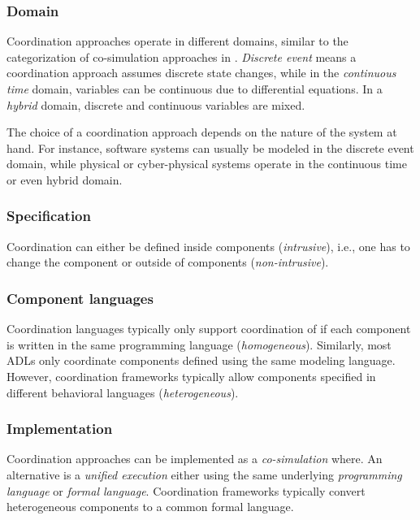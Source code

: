 \documentclass[runningheads]{llncs}
\begin{document}
\subsubsection{Domain} Coordination approaches operate in different domains, similar to the categorization of co-simulation approaches in \cite{gomesCoSimulationSurvey2019}.
\textit{Discrete event} means a coordination approach assumes discrete state changes, while in the \textit{continuous time} domain, variables can be continuous due to differential equations.
In a \textit{hybrid} domain, discrete and continuous variables are mixed.

The choice of a coordination approach depends on the nature of the system at hand.
For instance, software systems can usually be modeled in the discrete event domain, while physical or cyber-physical systems operate in the continuous time or even hybrid domain.

\subsubsection{Specification} Coordination can either be defined inside components (\textit{intrusive}), i.e., one has to change the component or outside of components (\textit{non-intrusive}).


\subsubsection{Component languages} Coordination languages typically only support coordination of if each component is written in the same programming language (\textit{homogeneous}).
Similarly, most ADLs only coordinate components defined using the same modeling language.
However, coordination frameworks typically allow components specified in different behavioral languages (\textit{heterogeneous}).


\subsubsection{Implementation} Coordination approaches can be implemented as a \textit{co-simulation} where.
An alternative is a \textit{unified execution} either using the same underlying \textit{programming language} or \textit{formal language}.
Coordination frameworks typically convert heterogeneous components to a common formal language.
\end{document}
